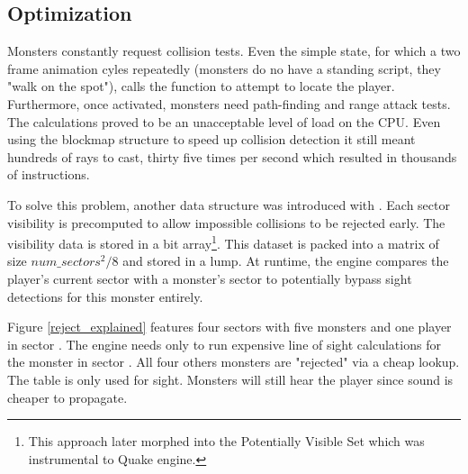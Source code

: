\subsection{Optimization}
Monsters constantly request collision tests. Even the simple  state, for which a two frame animation cyles repeatedly (monsters do no have a standing script, they "walk on the spot"), calls the  function to attempt to locate the player. Furthermore, once activated, monsters need path-finding and range attack tests. The calculations proved to be an unacceptable level of load on the CPU. Even using the blockmap structure to speed up collision detection it still meant hundreds of rays to cast, thirty five times per second which resulted in thousands of instructions.\\
\par
To solve this problem, another data structure was introduced with . Each sector visibility is precomputed to allow impossible collisions to be rejected early. The visibility data is stored in a bit array\footnote{This approach later morphed into the Potentially Visible Set which was instrumental to Quake engine.}. This dataset is packed into a matrix of size $num\_sectors^2/8$ and stored in a  lump. At runtime, the engine compares the player's current sector with a monster's sector to potentially bypass sight detections for this monster entirely.\\
\par
{}
\vspace{-7pt}
Figure \ref{reject_explained} features four sectors with five monsters and one player in sector . The engine needs only to run expensive line of sight calculations for the monster in sector . All four others monsters are "rejected" via a cheap lookup. The table is only used for sight. Monsters will still hear the player since sound is cheaper to propagate.\\
\par
{}






